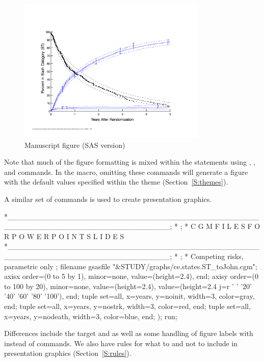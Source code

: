 \documentclass[nojss]{jss}\usepackage[]{graphicx}\usepackage[]{color}
\begin{document}
\begin{figure}[!htpb]
    \centering
    \includegraphics[width=0.8\textwidth]{../inst/ceStatesST.pdf}
    \caption{Manuscript figure (SAS version)}
    \label{F:sasManuscript}
\end{figure}

Note that much of the figure formatting is mixed within the  statements using , ,  and  commands. In the  macro, omitting these commands will generate a figure with the default values specified within the  theme (Section~\ref{S:themes}).


A similar set of  commands is used to create presentation graphics.
\begin{CodeChunk}\small
\begin{CodeInput}
*______________________________________________________________________________;
*                                                                              ;
*       C G M   F I L E S   F O R   P O W E R P O I N T   S L I D E S
*______________________________________________________________________________;
*                                                                              ;
* Competing risks, parametric only                                             ;
filename gsasfile "&STUDY/graphs/ce.states.ST_toJohn.cgm";
axisx order=(0 to 5 by 1), minor=none, value=(height=2.4), end;
axisy order=(0 to 100 by 20), minor=none, value=(height=2.4), 
value=(height=2.4 j=r ' ' '20' '40' '60' '80' '100'), end;
tuple set=all, x=years, y=noinit, width=3, color=gray, end;
tuple set=all, x=years, y=nostrk, width=3, color=red, end;
tuple set=all, x=years, y=nodeath, width=3, color=blue, end;
);
run;  
\end{CodeInput}
\end{CodeChunk}
Differences include the target  and  as well as some handling of figure labels with  instead of  commands. We also have rules for what to and not to include in presentation graphics (Section~\ref{S:rules}).
\end{document}
